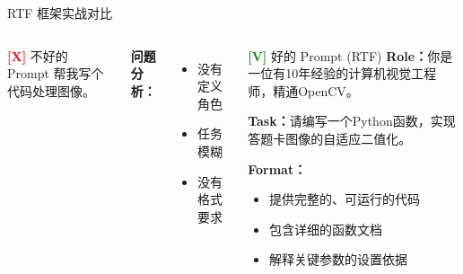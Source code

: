 \begin{frame}{RTF 框架实战对比}
	\small
	\begin{columns}
		\begin{alertblock}{\textcolor{red}{\textbf{[X]}} 不好的 Prompt}
			帮我写个代码处理图像。
		\end{alertblock}

		\vspace{0.3cm}

		\textbf{问题分析：}
		\begin{itemize}
			\item 没有定义角色
			\item 任务模糊
			\item 没有格式要求
		\end{itemize}

		\begin{exampleblock}{\textcolor{green}{\textbf{[V]}} 好的 Prompt (RTF)}
			\textbf{Role：}你是一位有10年经验的计算机视觉工程师，精通OpenCV。

			\vspace{0.2cm}

			\textbf{Task：}请编写一个Python函数，实现答题卡图像的自适应二值化。

			\vspace{0.2cm}

			\textbf{Format：}
			\begin{itemize}
				\item 提供完整的、可运行的代码
				\item 包含详细的函数文档
				\item 解释关键参数的设置依据
			\end{itemize}
		\end{exampleblock}
	\end{columns}
\end{frame}



